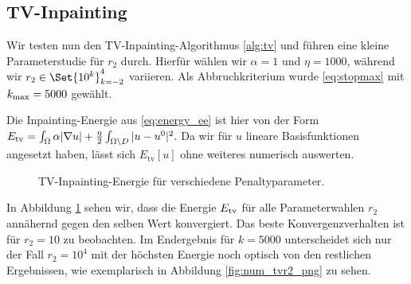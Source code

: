 \documentclass{mythesis}
\begin{document}
\subsection*{TV-Inpainting}

Wir testen nun den TV-Inpainting-Algorithmus \ref{alg:tv} und führen eine kleine Parameterstudie für $r_2$ durch.
Hierfür wählen wir $\alpha = 1$ und $\eta = 1000$, während wir $r_2 \in \Set{10^k}_{k=-2}^4$ variieren.
Als Abbruchkriterium wurde \eqref{eq:stopmax} mit $k_{\mathrm{max}} = 5000$ gewählt.


Die Inpainting-Energie aus \eqref{eq:energy_ee} ist hier von der Form
\begin{math}
    E_{\mathrm{tv}} = \int_\Omega \alpha |\nabla u| + \frac{\eta}{2} \int_{\Omega\setminus D} |u - u^0|^2.
\end{math}
Da wir für $u$ lineare Basisfunktionen angesetzt haben, lässt sich $E_{\mathrm{tv}}[u]$ ohne weiteres numerisch auswerten.
\begin{figure}[ht]
    \centering
    \caption{TV-Inpainting-Energie für verschiedene Penaltyparameter.}
    \label{fig:num_tvr2_etv}
\end{figure}
In Abbildung \ref{fig:num_tvr2_etv} sehen wir, dass die Energie $E_{\mathrm{tv}}$ für alle Parameterwahlen $r_2$ annähernd gegen den selben Wert konvergiert.
Das beste Konvergenzverhalten ist für $r_2 = 10$ zu beobachten.
Im Endergebnis für $k = 5000$ unterscheidet sich nur der Fall $r_2 = 10^4$ mit der höchsten Energie noch optisch von den restlichen Ergebnissen, wie exemplarisch in Abbildung \ref{fig:num_tvr2_png} zu sehen.
\end{document}
